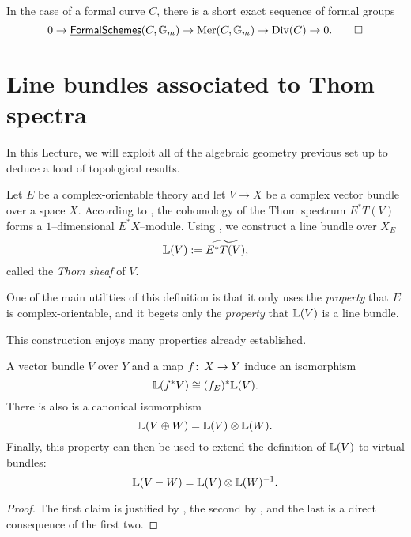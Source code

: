 \begin{theorem}
In the case of a formal curve $C$, there is a short exact sequence of formal groups \[0 \to \operatorname{\underline{\smash{\mathsf{FormalSchemes}}}}(C, \mathbb G_m) \to \operatorname{Mer}(C, \mathbb G_m) \to \operatorname{Div}(C) \to 0. \qed\]
\end{theorem}











\section{Line bundles associated to Thom spectra}\label{ProjectivizationLecture}

In this Lecture, we will exploit all of the algebraic geometry previous set up to deduce a load of topological results.

\begin{definition}\label{DefnThomSheaf}
Let $E$ be a complex-orientable theory and let $V \to X$ be a complex vector bundle over a space $X$.  According to , the cohomology of the Thom spectrum $E^* T(V)$ forms a $1$--dimensional $E^* X$--module.  Using , we construct a line bundle over $X_E$ \[\mathbb{L}(V) := \widetilde{E^* T(V)},\] called the \textit{Thom sheaf} of $V$.
\end{definition}

\begin{remark}
One of the main utilities of this definition is that it only uses the \emph{property} that $E$ is complex-orientable, and it begets only the \emph{property} that $\mathbb{L}(V)$ is a line bundle.
\end{remark}

This construction enjoys many properties already established.
\begin{corollary}\label{PropertiesOfThomSheaves}
A vector bundle $V$ over $Y$ and a map $f \colon\thinspace X \to Y$ induce an isomorphism \[\mathbb{L}(f^* V) \cong (f_E)^* \mathbb{L}(V).\]  There is also is a canonical isomorphism \[\mathbb{L}(V \oplus W) = \mathbb{L}(V) \otimes \mathbb{L}(W).\]  Finally, this property can then be used to extend the definition of $\mathbb{L}(V)$ to virtual bundles: \[\mathbb{L}(V - W) = \mathbb{L}(V) \otimes \mathbb{L}(W)^{-1}.\]
\end{corollary}
\begin{proof}
The first claim is justified by , the second by , and the last is a direct consequence of the first two.
\end{proof}

